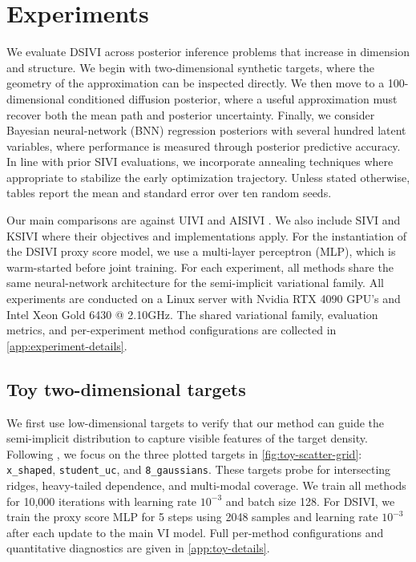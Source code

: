 \section{Experiments}
\label{sec:experiments}

We evaluate DSIVI across posterior inference problems that increase in dimension and structure.  We begin with two-dimensional synthetic targets, where the geometry of the approximation can be inspected directly.  We then move to a 100-dimensional conditioned diffusion posterior, where a useful approximation must recover both the mean path and posterior uncertainty.  Finally, we consider Bayesian neural-network (BNN) regression posteriors with several hundred latent variables, where performance is measured through posterior predictive accuracy.  In line with prior SIVI evaluations, we incorporate annealing techniques where appropriate to stabilize the early optimization trajectory.  Unless stated otherwise, tables report the mean and standard error over ten random seeds.

Our main comparisons are against UIVI and AISIVI \citep{uivi2019,pielok2025revisiting}.  We also include SIVI \citep{yin2018semi} and KSIVI \citep{cheng2024kernel} where their objectives and implementations apply. For the instantiation of the DSIVI proxy score model, we use a multi-layer perceptron (MLP), which is warm-started before joint training. For each experiment, all methods share the same neural-network architecture for the semi-implicit variational family. All experiments are conducted on a Linux server with Nvidia RTX 4090 GPU's and Intel Xeon Gold 6430 @ 2.10GHz. The shared variational family, evaluation metrics, and per-experiment method configurations are collected in \cref{app:experiment-details}.

\subsection{Toy two-dimensional targets}
\label{subsec:toy-experiments}

We first use low-dimensional targets to verify that our method can guide the semi-implicit distribution to capture visible features of the target density. Following \citet{yu2023semi,li2023samplingmollifiedinteractionenergy}, we focus on the three plotted targets in \cref{fig:toy-scatter-grid}: \texttt{x\_shaped}, \texttt{student\_uc}, and \texttt{8\_gaussians}.  These targets probe for intersecting ridges, heavy-tailed dependence, and multi-modal coverage. We train all methods for 10,000 iterations with learning rate $10^{-3}$ and batch size 128. For DSIVI, we train the proxy score MLP for 5 steps using 2048 samples and learning rate $10^{-3}$ after each update to the main VI model. Full per-method configurations and quantitative diagnostics are given in \cref{app:toy-details}.


